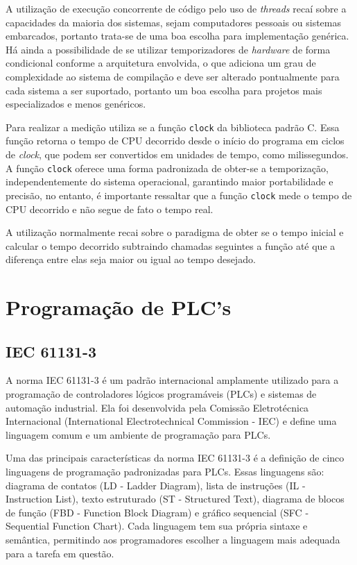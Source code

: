 A utilização de execução concorrente de código pelo uso de \textit{threads} recaí sobre a capacidades da maioria dos sistemas, sejam computadores pessoais ou sistemas embarcados, portanto trata-se de uma boa escolha para implementação genérica. Há ainda a possibilidade de se utilizar temporizadores de \textit{hardware} de forma condicional conforme a arquitetura envolvida, o que adiciona um grau de complexidade ao sistema de compilação e deve ser alterado pontualmente para cada sistema a ser suportado, portanto um boa escolha para projetos mais especializados e menos genéricos.

Para realizar a medição utiliza se a função \lstinline{clock} da biblioteca padrão C. Essa função retorna o tempo de CPU decorrido desde o início do programa em ciclos de \textit{clock}, que podem ser convertidos em unidades de tempo, como milissegundos. A função \lstinline{clock} oferece uma forma padronizada de obter-se a temporização, independentemente do sistema operacional, garantindo maior portabilidade e precisão, no entanto, é importante ressaltar que a função \lstinline{clock} mede o tempo de CPU decorrido e não segue de fato o tempo real.

A utilização normalmente recai sobre o paradigma de obter se o tempo inicial e calcular o tempo decorrido subtraindo chamadas seguintes a função até que a diferença entre elas seja maior ou igual ao tempo desejado. 



\section{Programação de PLC's}

\subsection{IEC 61131-3}

A norma IEC 61131-3 \cite{IEC611313} é um padrão internacional amplamente utilizado para a programação de controladores lógicos programáveis (PLCs) e sistemas de automação industrial. Ela foi desenvolvida pela Comissão Eletrotécnica Internacional (International Electrotechnical Commission - IEC) e define uma linguagem comum e um ambiente de programação para PLCs.

Uma das principais características da norma IEC 61131-3 é a definição de cinco linguagens de programação padronizadas para PLCs. Essas linguagens são: diagrama de contatos (LD - Ladder Diagram), lista de instruções (IL - Instruction List), texto estruturado (ST - Structured Text), diagrama de blocos de função (FBD - Function Block Diagram) e gráfico sequencial (SFC - Sequential Function Chart). Cada linguagem tem sua própria sintaxe e semântica, permitindo aos programadores escolher a linguagem mais adequada para a tarefa em questão.

